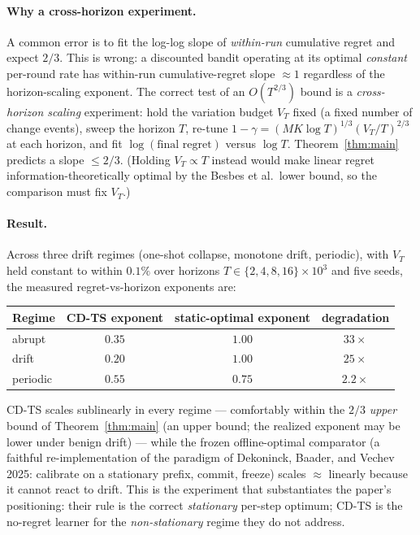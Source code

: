 \documentclass[11pt]{article}
\theoremstyle{definition}
\begin{document}
\paragraph{Why a cross-horizon experiment.} A common error is to fit the
log-log slope of \emph{within-run} cumulative regret and expect $2/3$. This is
wrong: a discounted bandit operating at its optimal \emph{constant} per-round
rate has within-run cumulative-regret slope $\approx 1$ regardless of the
horizon-scaling exponent. The correct test of an $O(T^{2/3})$ bound is a
\emph{cross-horizon scaling} experiment: hold the variation budget $V_T$ fixed
(a fixed number of change events), sweep the horizon $T$, re-tune
$1-\gamma = (MK\log T)^{1/3}(V_T/T)^{2/3}$ at each horizon, and fit
$\log(\text{final regret})$ versus $\log T$. Theorem~\ref{thm:main} predicts a
slope $\leq 2/3$. (Holding $V_T \propto T$ instead would make linear regret
information-theoretically optimal by the Besbes et al.\ lower bound, so the
comparison must fix $V_T$.)

\paragraph{Result.} Across three drift regimes (one-shot collapse,
monotone drift, periodic), with $V_T$ held constant to within $0.1\%$ over
horizons $T \in \{2,4,8,16\}{\times}10^3$ and five seeds, the measured
regret-vs-horizon exponents are:
\begin{center}
\begin{tabular}{lccc}
\hline
Regime & CD-TS exponent & static-optimal exponent & degradation \\
\hline
abrupt   & $0.35$ & $1.00$ & $33\times$ \\
drift    & $0.20$ & $1.00$ & $25\times$ \\
periodic & $0.55$ & $0.75$ & $2.2\times$ \\
\hline
\end{tabular}
\end{center}
CD-TS scales sublinearly in every regime --- comfortably within the $2/3$
\emph{upper} bound of Theorem~\ref{thm:main} (an upper bound; the realized
exponent may be lower under benign drift) --- while the frozen offline-optimal
comparator (a faithful re-implementation of the paradigm of Dekoninck,
Baader, and Vechev 2025: calibrate on a stationary prefix, commit, freeze)
scales $\approx$ linearly because it cannot react to drift. This is the
experiment that substantiates the paper's positioning: their rule is the
correct \emph{stationary} per-step optimum; CD-TS is the no-regret learner for
the \emph{non-stationary} regime they do not address.
\end{document}
